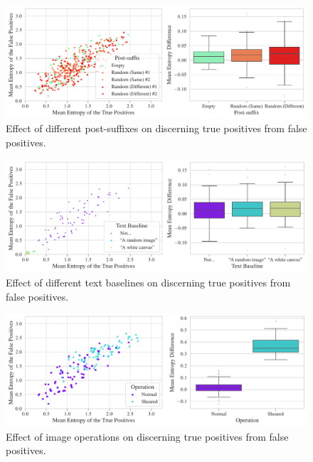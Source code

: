\begin{figure}[H]
    \centering
    \includegraphics[width=\textwidth]{images/post-suffix_adversarial.pdf}
    \caption{Effect of different post-suffixes on discerning true positives from false positives.}
    \label{fig:post-suffix-adversarial}
\end{figure}

\begin{figure}[H]
    \centering
    \includegraphics[width=\textwidth]{images/baseline_adversarial.pdf}
    \caption{Effect of different text baselines on discerning true positives from false positives.}
    \label{fig:baseline-adversarial}
\end{figure}

\begin{figure}[H]
    \centering
    \includegraphics[width=\textwidth]{images/texturing-operations_adversarial.pdf}
    \caption{Effect of image operations on discerning true positives from false positives.}
    \label{fig:texturing-operations-adversarial}
\end{figure}

